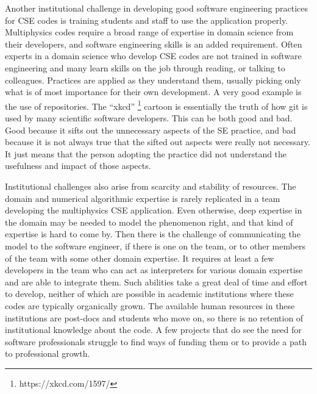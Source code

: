 Another institutional challenge in developing good software
engineering practices for CSE codes is training students and staff to
use the application properly. Multiphysics codes require a broad range
of expertise in domain science from their developers, and software
engineering skills is an added requirement.  Often experts in a domain
science who develop CSE codes are not trained in software engineering
and many learn skills on the job through reading, or talking to
colleagues. Practices are applied as they understand them, usually
picking only what is of most importance for their own development. A
very good example is the use of repositories. The ``xkcd''
\footnote{https://xkcd.com/1597/} cartoon is
essentially the truth of how git is used by many scientific software
developers. 
This can be both good and bad. Good because it sifts out the unnecessary aspects of the SE
practice, and bad because it is not always true that the sifted out
aspects were really not necessary. It just means that the person
adopting the practice did not understand the usefulness and impact of
those aspects.


Institutional challenges also arise from scarcity and stability of
resources. The domain and numerical algorithmic
expertise is rarely replicated in a team developing the multiphysics
CSE application.  Even otherwise, deep expertise in the domain may be
needed to model the phenomenon right, and that kind of expertise is
hard to come by. Then there is the challenge of communicating the
model to the software engineer, if there is one on the team, or to
other members of the team with some other domain expertise. It requires at least a
few developers in the team who can act as interpreters for various
domain expertise and are able to integrate them. Such abilities take a
great deal of time and effort to develop, neither of which are
possible in academic institutions where these codes are typically
organically grown. The available human resources in these institutions
are post-docs and students who move on, so there is no retention of
institutional knowledge about the code.  A few projects that do see
the need for software professionals struggle to find ways of funding
them or to provide a path to professional growth. 

